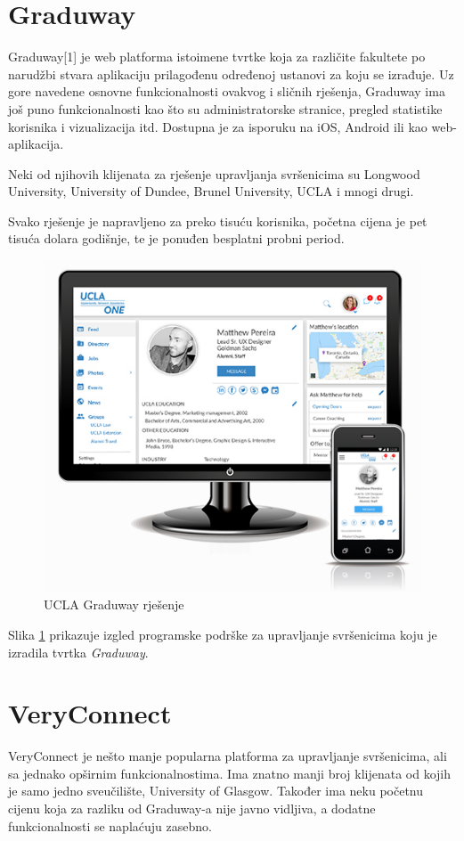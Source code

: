\documentclass[zavrsni, numeric]{fer}
\begin{document}
\section{Graduway}
Graduway[1] je web platforma istoimene tvrtke koja za različite fakultete po narudžbi stvara aplikaciju prilagođenu određenoj ustanovi za koju se izrađuje. Uz gore navedene osnovne funkcionalnosti ovakvog i sličnih rješenja, Graduway ima još puno funkcionalnosti kao što su administratorske stranice, pregled statistike korisnika i vizualizacija itd. Dostupna je za isporuku na iOS, Android ili kao web- aplikacija.

Neki od njihovih klijenata za rješenje upravljanja svršenicima su Longwood University, University of Dundee, Brunel University, UCLA i mnogi drugi.

Svako rješenje je napravljeno za preko tisuću korisnika, početna cijena je pet tisuća dolara godišnje, te je ponuđen besplatni probni period.

\begin{figure}[H]
	\centering
	\includegraphics[width=13cm]{slike/izgledUCLAgraduwayRjesenja.png}
	\caption{UCLA Graduway rješenje}
	\label{fig:ucla-graduway}
\end{figure}

Slika \ref{fig:ucla-graduway} prikazuje izgled programske podrške za upravljanje svršenicima koju je izradila tvrtka \textit{Graduway}.

\section{VeryConnect}
VeryConnect je nešto manje popularna platforma za upravljanje svršenicima, ali sa jednako opširnim funkcionalnostima. Ima znatno manji broj klijenata od kojih je samo jedno sveučilište, University of Glasgow. Također ima neku početnu cijenu koja za razliku od Graduway-a nije javno vidljiva, a dodatne funkcionalnosti se naplaćuju zasebno.
\end{document}

